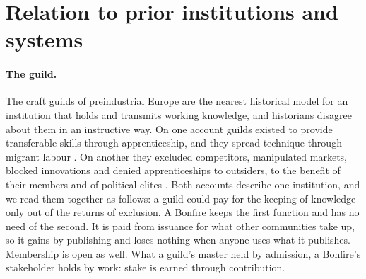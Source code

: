 \section{Relation to prior institutions and systems}\label{sec:prior}

\paragraph{The guild.} The craft guilds of preindustrial Europe are the nearest historical model for an institution
that holds and transmits working knowledge, and historians disagree about them in an instructive way. On one
account guilds existed to provide transferable skills through apprenticeship, and they spread technique through
migrant labour \citep{epstein1998craft}. On another they excluded competitors, manipulated markets, blocked
innovations and denied apprenticeships to outsiders, to the benefit of their members and of political elites
\citep{ogilvie2019guilds}. Both accounts describe one institution, and we read them together as follows: a guild
could pay for the keeping of knowledge only out of the returns of exclusion. A Bonfire keeps the first function and
has no need of the second. It is paid from issuance for what other communities take up, so it gains by publishing
and loses nothing when anyone uses what it publishes. Membership is open as well. What a guild's master held by
admission, a Bonfire's stakeholder holds by work: stake is earned through contribution.

